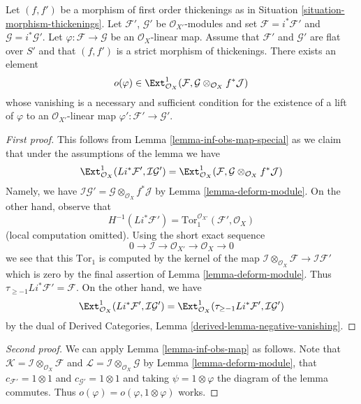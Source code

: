 \begin{lemma}
\label{lemma-inf-obs-map-rel}
Let $(f, f')$ be a morphism of first
order thickenings as in Situation \ref{situation-morphism-thickenings}.
Let $\mathcal{F}'$, $\mathcal{G}'$ be $\mathcal{O}_{X'}$-modules and set
$\mathcal{F} = i^*\mathcal{F}'$ and $\mathcal{G} = i^*\mathcal{G}'$.
Let $\varphi : \mathcal{F} \to \mathcal{G}$ be an $\mathcal{O}_X$-linear map.
Assume that $\mathcal{F}'$ and $\mathcal{G}'$ are flat over $S'$ and
that $(f, f')$ is a strict morphism of thickenings. There exists an element
$$
o(\varphi) \in  \Ext^1_{\mathcal{O}_X}(\mathcal{F},
\mathcal{G} \otimes_{\mathcal{O}_X} f^*\mathcal{J})
$$
whose vanishing is a necessary and sufficient condition for the
existence of a lift of $\varphi$ to an $\mathcal{O}_{X'}$-linear map
$\varphi' : \mathcal{F}' \to \mathcal{G}'$.
\end{lemma}

\begin{proof}[First proof]
This follows from Lemma \ref{lemma-inf-obs-map-special}
as we claim that under the assumptions of the lemma we have
$$
\Ext^1_{\mathcal{O}_X}(Li^*\mathcal{F}',
\mathcal{I}\mathcal{G}') =
\Ext^1_{\mathcal{O}_X}(\mathcal{F},
\mathcal{G} \otimes_{\mathcal{O}_X} f^*\mathcal{J})
$$
Namely, we have
$\mathcal{I}\mathcal{G}' =
\mathcal{G} \otimes_{\mathcal{O}_X} f^*\mathcal{J}$
by Lemma \ref{lemma-deform-module}.
On the other hand, observe that
$$
H^{-1}(Li^*\mathcal{F}') =
\text{Tor}_1^{\mathcal{O}_{X'}}(\mathcal{F}', \mathcal{O}_X)
$$
(local computation omitted). Using the short exact sequence
$$
0 \to \mathcal{I} \to \mathcal{O}_{X'} \to \mathcal{O}_X \to 0
$$
we see that this $\text{Tor}_1$ is computed by the kernel of the map
$\mathcal{I} \otimes_{\mathcal{O}_X} \mathcal{F} \to \mathcal{I}\mathcal{F}'$
which is zero by the final assertion of Lemma \ref{lemma-deform-module}.
Thus $\tau_{\geq -1}Li^*\mathcal{F}' = \mathcal{F}$.
On the other hand, we have
$$
\Ext^1_{\mathcal{O}_X}(Li^*\mathcal{F}',
\mathcal{I}\mathcal{G}') =
\Ext^1_{\mathcal{O}_X}(\tau_{\geq -1}Li^*\mathcal{F}',
\mathcal{I}\mathcal{G}')
$$
by the dual of
Derived Categories, Lemma \ref{derived-lemma-negative-vanishing}.
\end{proof}

\begin{proof}[Second proof]
We can apply Lemma \ref{lemma-inf-obs-map} as follows. Note that
$\mathcal{K} = \mathcal{I} \otimes_{\mathcal{O}_X} \mathcal{F}$ and
$\mathcal{L} = \mathcal{I} \otimes_{\mathcal{O}_X} \mathcal{G}$
by Lemma \ref{lemma-deform-module}, that
$c_{\mathcal{F}'} = 1 \otimes 1$ and $c_{\mathcal{G}'} = 1 \otimes 1$
and taking $\psi = 1 \otimes \varphi$ the diagram of the lemma
commutes. Thus $o(\varphi) = o(\varphi, 1 \otimes \varphi)$
works.
\end{proof}

